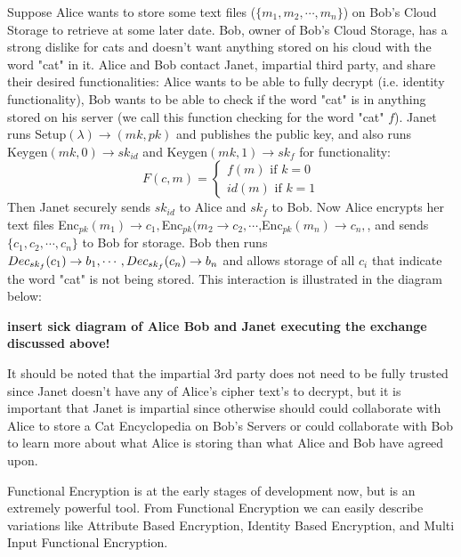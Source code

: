 \documentclass[12pt,twoside]{reedthesis}
\begin{document}
\par Suppose Alice wants to store some text files ($\{m_1,m_2,\cdots, m_n \}$) on Bob's Cloud Storage to retrieve at some later date.
 Bob, owner of Bob's Cloud Storage, has a strong dislike for cats and doesn't want anything stored on
  his cloud with the word "cat" in it. Alice and Bob contact Janet, impartial third party, and share their desired functionalities: Alice wants to be able to fully decrypt (i.e. identity functionality), Bob wants to be able to check if the word "cat" is in anything stored on his server (we call this function checking for the word "cat" $f$). Janet runs Setup$(\lambda)\rightarrow (mk, pk)$ and publishes the public key, and also runs Keygen$(mk,0) \rightarrow sk_{id}$ and Keygen$(mk,1) \rightarrow sk_f$ for functionality:
$$F(c,m) = \begin{cases}
f(m) \text{ if } k = 0 \\
id(m) \text{ if } k = 1
\end{cases} $$
Then Janet securely sends $sk_{id}$ to Alice and $sk_{f}$ to Bob. Now Alice encrypts her text files Enc$_{pk}(m_1) \rightarrow c_1,$Enc$_{pk}(m_2 \rightarrow c_2, \cdots $,Enc$_{pk}(m_n) \rightarrow c_n,$, and sends $\{c_1,c_2, \cdots, c_n \}$ to Bob for storage. Bob then runs $Dec_{sk_f}(c_1) \rightarrow b_1 , \cdots, Dec_{sk_f}(c_n) \rightarrow b_n $ and allows storage of all $c_i$ that indicate the word "cat" is not being stored.  This interaction is illustrated in the diagram below:

\begin{center}

\textbf{ insert sick diagram of Alice Bob and Janet executing the exchange discussed above!}
\end{center}

\par It should be noted that the impartial 3rd party does not need to be fully trusted since Janet doesn't have any of Alice's cipher text's to decrypt, but it is important that Janet is impartial since otherwise should could collaborate with Alice to store a Cat Encyclopedia on Bob's Servers or could collaborate with Bob to learn more about what Alice is storing than what Alice and Bob have agreed upon.


\par Functional Encryption is at the early stages of development now, but is an extremely powerful tool. From Functional Encryption we can easily describe variations like Attribute Based Encryption, Identity Based Encryption, and Multi Input Functional Encryption.
\end{document}
